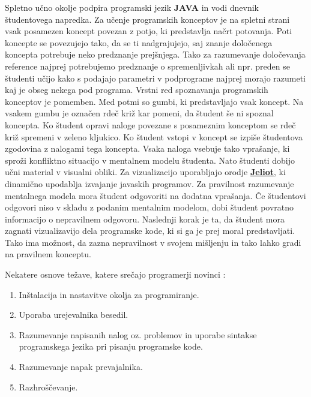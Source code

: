 
Spletno učno okolje podpira programski jezik \textbf{JAVA} in vodi
dnevnik študentovega napredka. Za učenje programskih konceptov je na
spletni strani vsak posamezen koncept povezan z potjo, ki predstavlja
načrt potovanja. Poti koncepte se povezujejo tako, da se ti
nadgrajujejo, saj znanje določenega koncepta potrebuje neko predznanje
prejšnjega. Tako za razumevanje določevanja reference najprej
potrebujemo predznanje o spremenljivkah ali npr. preden se študenti
učijo kako s podajajo parametri v podprograme najprej morajo razumeti
kaj je obseg nekega pod programa. Vrstni red spoznavanja programskih
konceptov je pomemben. Med potmi so gumbi, ki predstavljajo vsak
koncept. Na vsakem gumbu je označen rdeč križ kar pomeni, da študent
še ni spoznal koncepta. Ko študent opravi naloge povezane s posameznim
konceptom se rdeč križ spremeni v zeleno kljukico. Ko študent vstopi v
koncept se izpiše študentova zgodovina z nalogami tega koncepta. Vsaka
naloga vsebuje tako vprašanje, ki sproži konfliktno situacijo v
mentalnem modelu študenta. Nato študenti dobijo učni material v
visualni obliki. Za vizualizacijo uporabljajo orodje
\href{https://cs.joensuu.fi/jeliot/}{\textbf{Jeliot}}, ki dinamično
upodablja izvajanje javaskih programov. Za pravilnost razumevanje
mentalnega modela mora študent odgovoriti na dodatna vprašanja. Če
študentovi odgovori niso v skladu z podanim mentalnim modelom, dobi
študent povratno informacijo o nepravilnem odgovoru. Naslednji korak
je ta, da študent mora zagnati vizualizavijo dela programske kode, ki
si ga je prej moral predstavljati. Tako ima možnost, da zazna
nepravilnost v svojem mišljenju in tako lahko gradi na pravilnem
konceptu.




Nekatere osnove težave, katere srečajo programerji novinci \cite{thesisAWebP}:
\begin{enumerate}
\item
  Inštalacija in nastavitve okolja za programiranje.
\item
  Uporaba urejevalnika besedil.
\item Razumevanje napisanih nalog oz. problemov in uporabe sintakse
  programskega jezika pri pisanju programske kode.
\item
  Razumevanje napak prevajalnika.
\item
  Razhroščevanje.
\end{enumerate}

